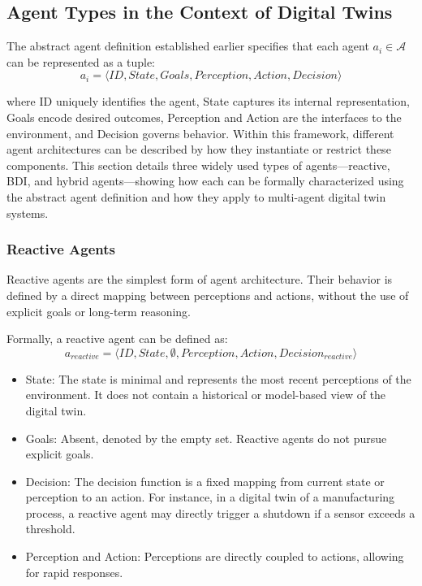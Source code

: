\subsection{Agent Types in the Context of Digital Twins}

The abstract agent definition established earlier specifies that each agent $a_i \in \mathcal{A}$ can be represented as a tuple:
\begin{equation*}
    a_i = \langle ID, State, Goals, Perception, Action, Decision \rangle
\end{equation*}

where ID uniquely identifies the agent, State captures its internal representation, Goals encode desired outcomes, Perception and Action are the interfaces to the environment, and Decision governs behavior. Within this framework, different agent architectures can be described by how they instantiate or restrict these components. This section details three widely used types of agents—reactive, BDI, and hybrid agents—showing how each can be formally characterized using the abstract agent definition and how they apply to multi-agent digital twin systems.

\subsubsection{Reactive Agents}

Reactive agents are the simplest form of agent architecture. Their behavior is defined by a direct mapping between perceptions and actions, without the use of explicit goals or long-term reasoning.

Formally, a reactive agent can be defined as:
\begin{equation*}
    a_{reactive} = \langle ID, State, \emptyset, Perception, Action, Decision_{reactive} \rangle
\end{equation*}
\begin{itemize}
    \item State: The state is minimal and represents the most recent perceptions of the environment. It does not contain a historical or model-based view of the digital twin.

    \item Goals: Absent, denoted by the empty set. Reactive agents do not pursue explicit goals.

    \item Decision: The decision function is a fixed mapping from current state or perception to an action. For instance, in a digital twin of a manufacturing process, a reactive agent may directly trigger a shutdown if a sensor exceeds a threshold.

    \item Perception and Action: Perceptions are directly coupled to actions, allowing for rapid responses.
\end{itemize}

